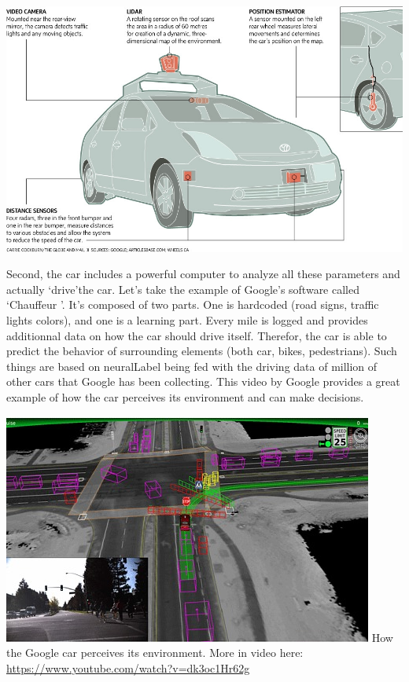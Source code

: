 \documentclass[12pt]{article}
\begin{document}
\smallskip
\includegraphics[width=\textwidth]{car-diagram}
\smallskip

Second, the car includes a powerful computer to analyze all these parameters
and actually \lq drive\rq the car. Let's take the example of Google's software
called \lq Chauffeur \rq . It's composed of two parts. One is hardcoded
(road signs, traffic lights colors), and one is a learning part. Every mile is
logged and provides additionnal data on how the car should drive itself.
Therefor, the car is able to predict the behavior of surrounding elements
(both car, bikes, pedestrians). Such things are based on \gls{neuralLabel} being
fed with the driving data of million of other cars
that Google has been collecting. This video by Google provides a great example
of how the car perceives its environment and can make decisions.

\smallskip
\includegraphics[width=\textwidth]{google-car}
How the Google car perceives its environment. More in video here: \url{https://www.youtube.com/watch?v=dk3oc1Hr62g}
\smallskip
\end{document}
